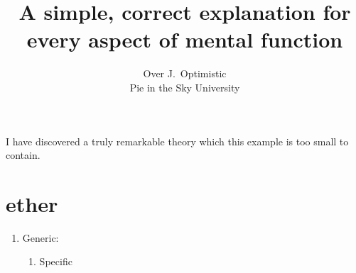 \documentclass{apa6e}
\title{A simple, correct explanation for every aspect of mental function}
\author{Over J.~Optimistic\\Pie in the Sky University}
\begin{document}
\maketitle
I have discovered a truly remarkable theory which
this example is too small to contain.
\section{ether}
\begin{enumerate}
 \item Generic:
 \begin{enumerate}
  \item Specific
 \end{enumerate}
\end{enumerate}




\end{document}
